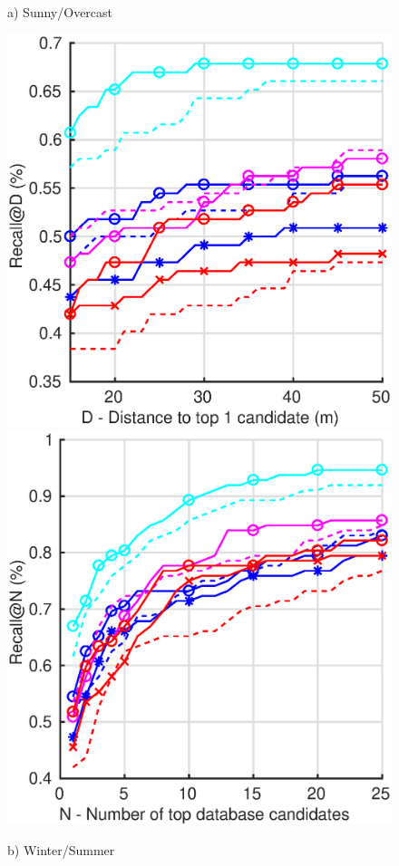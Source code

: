 \begin{figure}
\begin{minipage}{0.85\linewidth}
\begin{minipage}{0.49\linewidth}
		{\scriptsize a) Sunny/Overcast}
	\end{minipage}
	\begin{minipage}{0.49\linewidth}
		\center
		\includegraphics[width=0.49\linewidth]{plot/fig/snow_distance}	
		\includegraphics[width=0.49\linewidth]{plot/fig/snow_recall}
		
		{\scriptsize b) Winter/Summer}
	\end{minipage}
	

\end{minipage}
\end{figure}
